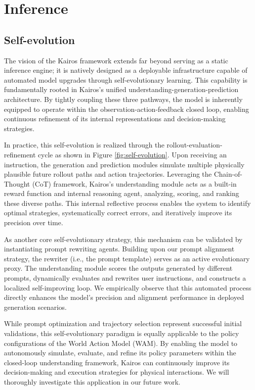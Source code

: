 \section{Inference}

\subsection{Self-evolution}

The vision of the Kairos framework extends far beyond serving as a static inference engine; it is natively designed as a deployable infrastructure capable of automated model upgrades through self-evolutionary learning. This capability is fundamentally rooted in Kairos’s unified understanding-generation-prediction architecture. By tightly coupling these three pathways, the model is inherently equipped to operate within the observation-action-feedback closed loop, enabling continuous refinement of its internal representations and decision-making strategies.

In practice, this self-evolution is realized through the rollout-evaluation-refinement cycle as shown in Figure \ref{fig:self-evolution}. Upon receiving an instruction, the generation and prediction modules simulate multiple physically plausible future rollout paths and action trajectories. Leveraging the Chain-of-Thought (CoT) framework, Kairos’s understanding module acts as a built-in reward function and internal reasoning agent, analyzing, scoring, and ranking these diverse paths. This internal reflective process enables the system to identify optimal strategies, systematically correct errors, and iteratively improve its precision over time.

As another core self-evolutionary strategy, this mechanism can be validated by instantiating prompt rewriting agents. Building upon our prompt alignment strategy, the rewriter (i.e., the prompt template) serves as an active evolutionary proxy. The understanding module scores the outputs generated by different prompts, dynamically evaluates and rewrites user instructions, and constructs a localized self-improving loop. We empirically observe that this automated process directly enhances the model’s precision and alignment performance in deployed generation scenarios.

While prompt optimization and trajectory selection represent successful initial validations, this self-evolutionary paradigm is equally applicable to the policy configurations of the World Action Model (WAM). By enabling the model to autonomously simulate, evaluate, and refine its policy parameters within the closed-loop understanding framework, Kairos can continuously improve its decision-making and execution strategies for physical interactions. We will thoroughly investigate this application in our future work.



